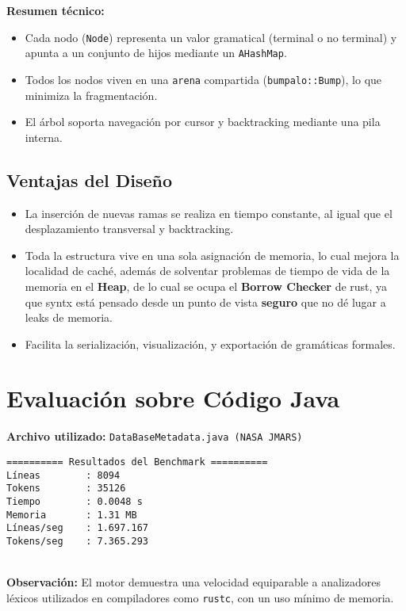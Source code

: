 \documentclass{article}
\begin{document}
\textbf{Resumen técnico:}
\begin{itemize}
    \item Cada nodo (\texttt{Node}) representa un valor gramatical (terminal o no terminal) y apunta a un conjunto de hijos mediante un \texttt{AHashMap}.
    \item Todos los nodos viven en una \texttt{arena} compartida (\texttt{bumpalo::Bump}), lo que minimiza la fragmentación.
    \item El árbol soporta navegación por cursor y backtracking mediante una pila interna.
\end{itemize}

\subsection*{Ventajas del Diseño}

\begin{itemize}
    \item La inserción de nuevas ramas se realiza en tiempo constante, al igual que el desplazamiento transversal y backtracking.
	\item Toda la estructura vive en una sola asignación de memoria, lo cual mejora la localidad de caché, además de solventar problemas de tiempo de vida de la memoria en el \textbf{Heap}, de lo cual se ocupa el \textbf{Borrow Checker} de rust, ya que syntx está pensado desde un punto de vista \textbf{seguro} que no dé lugar a leaks de memoria.
    \item Facilita la serialización, visualización, y exportación de gramáticas formales.
\end{itemize}

\newpage{}
\section*{Evaluación sobre Código Java}

\textbf{Archivo utilizado:} \texttt{DataBaseMetadata.java (NASA JMARS)}

\begin{verbatim}
========== Resultados del Benchmark ==========
Líneas        : 8094  
Tokens        : 35126  
Tiempo        : 0.0048 s  
Memoria       : 1.31 MB  
Líneas/seg    : 1.697.167  
Tokens/seg    : 7.365.293  
\end{verbatim}
\\
\textbf{Observación:} El motor demuestra una velocidad equiparable a analizadores léxicos utilizados en compiladores como \texttt{rustc}, con un uso mínimo de memoria.
\end{document}
